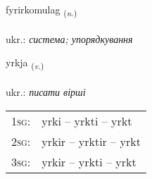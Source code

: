 \documentclass[frontgrid, backgrid]{flacards}\usepackage[]{graphicx}\usepackage[]{xcolor}
\begin{document}
\renewcommand{\flhead}{\vskip5pt \fboxsep=0pt {\small\bfseries\footnotesize Nafnorð | іменник}}
\renewcommand{\fcfoot}{\vskip5pt \fboxsep=0pt \hspace{2pt}{\small\bfseries\footnotesize 2K}}

\renewcommand{\blhead}{\vskip5pt {\small\bfseries\footnotesize Nafnorð | іменник }}
\renewcommand{\bcfoot}{\vskip5pt \hspace{2pt}{\small\bfseries\footnotesize 2K}}


{fyrirkomulag \small{\textsubscript{(\textit{n.})}} \\[1ex] %
 \\
ukr.: \emph{система; упорядкування} \\  [2ex]
\renewcommand*{\arraystretch}{0.8}
}

\renewcommand{\flhead}{\vskip5pt \fboxsep=0pt {\small\bfseries\footnotesize Sagnorð | дієслово}}
\renewcommand{\fcfoot}{\vskip5pt \fboxsep=0pt \hspace{2pt}{\small\bfseries\footnotesize 2K}}

\renewcommand{\blhead}{\vskip5pt {\small\bfseries\footnotesize Sagnorð | дієслово }}
\renewcommand{\bcfoot}{\vskip5pt \hspace{2pt}{\small\bfseries\footnotesize 2K}}


{yrkja \small{\textsubscript{(\textit{v.})}} \\[1ex] %
\textphonetic{[ɪr̥ca]} \\
ukr.: \emph{писати вірші} \\  [2ex]
\renewcommand*{\arraystretch}{0.8}
\begin{tabular}{p{1cm}l}
\textsc{1sg}: & yrki -- yrkti -- yrkt \\ 
\textsc{2sg}: & yrkir -- yrktir -- yrkt \\ 
\textsc{3sg}: & yrkir -- yrkti -- yrkt \\ 
\end{tabular}
}
\end{document}
